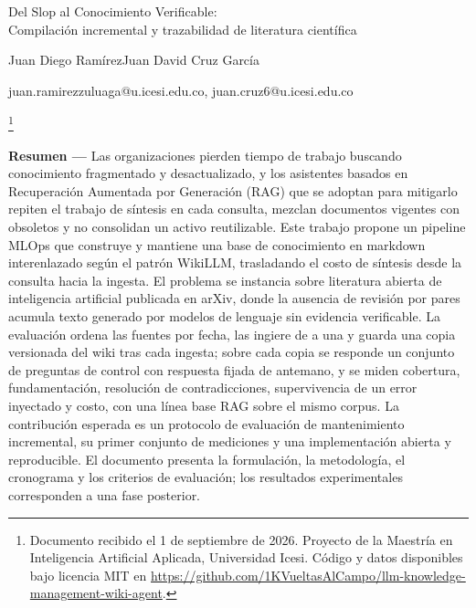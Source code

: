\documentclass[11pt,letterpaper]{article}
\newcommand{\notasinmarca}[1]{%
  \begingroup\renewcommand{\thefootnote}{}\footnote{#1}\addtocounter{footnote}{-1}\endgroup}
\begin{document}
\thispagestyle{fancy}

\begin{center}
{\LARGE Del Slop al Conocimiento Verificable:\\[2pt]
Compilación incremental y trazabilidad de literatura científica\par}
\vspace{18pt}
{\ttfamily\small Juan Diego Ramírez\quad Juan David Cruz García\par}
{\ttfamily\small juan.ramirezzuluaga@u.icesi.edu.co, juan.cruz6@u.icesi.edu.co\par}
\end{center}

\vspace{20pt}

\notasinmarca{Documento recibido el 1 de septiembre de 2026. Proyecto de la Maestría en Inteligencia Artificial Aplicada, Universidad Icesi. Código y datos disponibles bajo licencia MIT en \url{https://github.com/1KVueltasAlCampo/llm-knowledge-management-wiki-agent}.}

\noindent\textbf{Resumen —} Las organizaciones pierden tiempo de trabajo buscando conocimiento
fragmentado y desactualizado, y los asistentes basados en Recuperación Aumentada por Generación
(RAG) que se adoptan para mitigarlo repiten el trabajo de síntesis en cada consulta, mezclan
documentos vigentes con obsoletos y no consolidan un activo reutilizable. Este trabajo propone un
pipeline MLOps que construye y mantiene una base de conocimiento en markdown interenlazado según el
patrón WikiLLM, trasladando el costo de síntesis desde la consulta hacia la ingesta. El problema se
instancia sobre literatura abierta de inteligencia artificial publicada en arXiv, donde la ausencia
de revisión por pares acumula texto generado por modelos de lenguaje sin evidencia verificable. La
evaluación ordena las fuentes por fecha, las ingiere de a una y guarda una copia versionada del wiki
tras cada ingesta; sobre cada copia se responde un conjunto de preguntas de control con respuesta
fijada de antemano, y se miden cobertura, fundamentación, resolución de contradicciones,
supervivencia de un error inyectado y costo, con una línea base RAG sobre el mismo corpus. La
contribución esperada es un protocolo de evaluación de mantenimiento incremental, su primer conjunto
de mediciones y una implementación abierta y reproducible. El documento presenta la formulación, la
metodología, el cronograma y los criterios de evaluación; los resultados experimentales corresponden
a una fase posterior.
\end{document}
